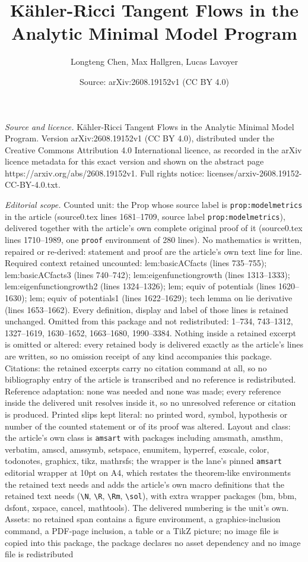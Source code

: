 \documentclass[10pt,a4paper]{amsart}
\title[K\"ahler-Ricci Tangent Flows in the Analytic Minimal Model P]{K\"ahler-Ricci Tangent Flows in the Analytic Minimal Model Program}
\author{Longteng Chen, Max Hallgren, Lucas Lavoyer}
\date{Source: arXiv:2608.19152v1 (CC BY 4.0)}
\begin{document}
\maketitle

\noindent\emph{Source and licence.} K\"ahler-Ricci Tangent Flows in the Analytic Minimal Model Program. Version arXiv:2608.19152v1 (CC BY 4.0), distributed under the Creative Commons Attribution 4.0 International licence, as recorded in the arXiv licence metadata for this exact version and shown on the abstract page https://arxiv.org/abs/2608.19152v1. Full rights notice: licenses/arxiv-2608.19152-CC-BY-4.0.txt.\par\smallskip

\noindent\textit{Editorial scope.} Counted unit: the Prop whose source label is \texttt{prop:modelmetrics} in the article (source0.tex lines 1681--1709, source label \texttt{prop:modelmetrics}), delivered together with the article's own complete original proof of it (source0.tex lines 1710--1989, one \texttt{proof} environment of 280 lines). No mathematics is written, repaired or re-derived: statement and proof are the article's own text line for line. Required context retained uncounted: lem:basicACfacts (lines 735--755); lem:basicACfacts3 (lines 740--742); lem:eigenfunctiongrowth (lines 1313--1333); lem:eigenfunctiongrowth2 (lines 1324--1326); lem; equiv of potentials (lines 1620--1630); lem; equiv of potentials1 (lines 1622--1629); tech lemma on lie derivative (lines 1653--1662). Every definition, display and label of those lines is retained unchanged. Omitted from this package and not redistributed: 1--734, 743--1312, 1327--1619, 1630--1652, 1663--1680, 1990--3384. Nothing inside a retained excerpt is omitted or altered: every retained body is delivered exactly as the article's lines are written, so no omission receipt of any kind accompanies this package. Citations: the retained excerpts carry no citation command at all, so no bibliography entry of the article is transcribed and no reference is redistributed. Reference adaptation: none was needed and none was made; every reference inside the delivered unit resolves inside it, so no unresolved reference or citation is produced. Printed slips kept literal: no printed word, symbol, hypothesis or number of the counted statement or of its proof was altered. Layout and class: the article's own class is \texttt{amsart} with packages including amsmath, amsthm, verbatim, amscd, amssymb, setspace, enumitem, hyperref, exscale, color, todonotes, graphicx, tikz, mathrsfs; the wrapper is the lane's pinned \texttt{amsart} editorial wrapper at 10pt on A4, which restates the theorem-like environments the retained text needs and adds the article's own macro definitions that the retained text needs (\texttt{\textbackslash N}, \texttt{\textbackslash R}, \texttt{\textbackslash Rm}, \texttt{\textbackslash sol}), with extra wrapper packages (bm, bbm, dsfont, xspace, cancel, mathtools). The delivered numbering is the unit's own. Assets: no retained span contains a figure environment, a graphics-inclusion command, a PDF-page inclusion, a table or a TikZ picture; no image file is copied into this package, the package declares no asset dependency and no image file is redistributed 
\end{document}
